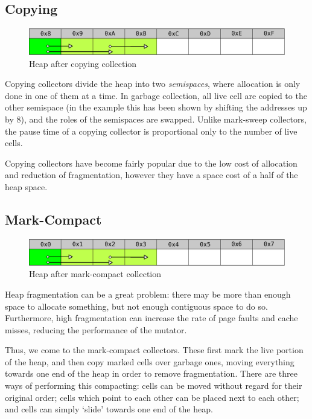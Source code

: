 \subsection{Copying}
\label{sec:lit-gc-copying}

\begin{figure}[h]
  \centering
  \includegraphics[width=\textwidth]{lit-gc-copying}
  \caption{Heap after copying collection}
  \label{fig:lit-gc-copying}
\end{figure}

Copying collectors divide the heap into two \textit{semispaces}, where
allocation is only done in one of them at a time. In garbage
collection, all live cell are copied to the other semispace (in the
example this has been shown by shifting the addresses up by 8), and
the roles of the semispaces are swapped\cite{Fenichel69}. Unlike
mark-sweep collectors, the pause time of a copying collector is
proportional only to the number of live cells\cite{Appel87}.

Copying collectors have become fairly popular due to the low cost of
allocation and reduction of fragmentation, however they have a space
cost of a half of the heap space\cite{GarbageCollection}.

\subsection{Mark-Compact}
\label{sec:lit-gc-markcompact}

\begin{figure}[h]
  \centering
  \includegraphics[width=\textwidth]{lit-gc-markcompact}
  \caption{Heap after mark-compact collection}
  \label{fig:lit-gc-markcompact}
\end{figure}

Heap fragmentation can be a great problem: there may be more than
enough space to allocate something, but not enough contiguous space to
do so. Furthermore, high fragmentation can increase the rate of page
faults and cache misses, reducing the performance of the
mutator\cite{Zorn90}.

Thus, we come to the mark-compact collectors. These first mark the
live portion of the heap, and then copy marked cells over garbage
ones, moving everything towards one end of the heap in order to remove
fragmentation\cite{GarbageCollection}. There are three ways of
performing this compacting: cells can be moved without regard for
their original order; cells which point to each other can be placed
next to each other; and cells can simply `slide' towards one end of the
heap\cite{Cohen81}.

